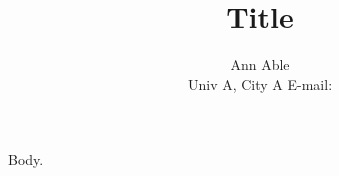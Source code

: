 \documentclass{JHEP3}
\title{Title}
\author{Ann Able\\ Univ A, City A E-mail: \email{ann@able.org}}
\begin{document}
Body.
\end{document}

